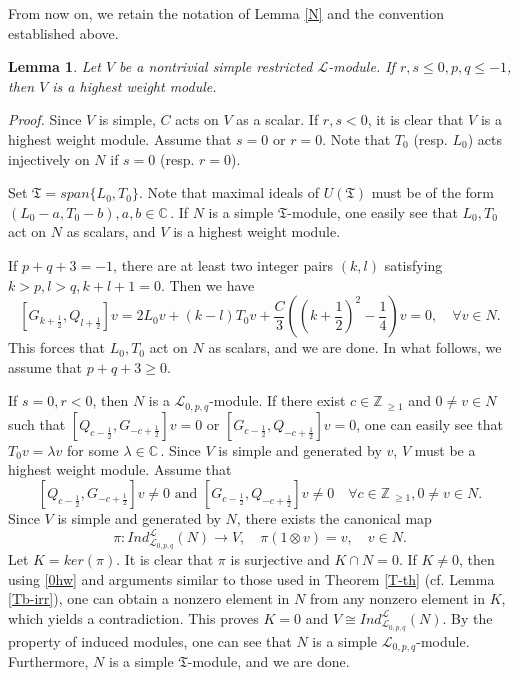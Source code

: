 \documentclass[12pt]{article}
\def\l{\lambda}
\def\ssc{\scriptscriptstyle}
\def\Z{\mathbb{Z}{\ssc\,}}
\def\C{\mathbb{C}{\ssc\,}}
\numberwithin{equation}{section}
\newtheorem{lemm}[theo]{Lemma}
\begin{document}
From now on, we retain the notation of Lemma \ref{N} and the convention established above.

\begin{lemm}\label{hw} Let $V$ be a nontrivial simple restricted $\mathcal{L}$-module. If $r,s\le 0, p,q\le -1$, then $V$ is  a highest weight module.
\end{lemm}

{\it Proof.} Since $V$ is simple, $C$ acts on $V$ as a  scalar. If $r,s<0$, it is clear that $V$ is  a highest weight module. Assume that $s=0$ or $r=0$. Note that $T_0$ (resp. $L_0$) acts injectively on $N$ if $s=0$ (resp. $r=0$).

Set $\mathfrak{T}=span\{L_0, T_0\}$.  Note that  maximal ideals of $U(\mathfrak{T})$ must be of the form $(L_0-a,T_0-b), a,b\in \C$. If $N$ is a  simple $\mathfrak{T}$-module, one easily see that $L_0,T_0$ act on $N$ as scalars, and $V$ is  a highest weight module.





If  $p+q+3=-1$,  there are at least two integer pairs $(k,l)$ satisfying $k>p,l>q, k+l+1=0$. Then we have
$$[G_{k+\frac{1}{2}},Q_{l+\frac{1}{2}}]v=2L_0v+(k-l)T_0v+\frac{C}{3}\left((k+\frac{1}{2})^2-\frac{1}{4}\right)v=0,\quad \forall v\in N.$$
This forces that $L_0,T_0$ act on $N$ as scalars, and we are done. In what follows, we assume that $p+q+3\ge 0.$

If $s=0, r<0$, then $N$ is a $\mathcal{L}_{0,p,q}$-module. If  there exist $c\in\Z_{\ge 1}$  and $0\ne v\in N$ such that $[Q_{c-\frac{1}{2}},G_{-c+\frac{1}{2}}]v=0$ or $[G_{c-\frac{1}{2}},Q_{-c+\frac{1}{2}}]v=0$, one can easily see that $T_0v=\l v$ for some $\l\in\C$. Since  $V$ is simple and generated by $v$, $V$ must be a highest weight module.  Assume that
\begin{equation}\label{0hw}[Q_{c-\frac{1}{2}},G_{-c+\frac{1}{2}}]v\ne 0 \mbox{ and } [G_{c-\frac{1}{2}},Q_{-c+\frac{1}{2}}]v\ne 0 \quad \forall c\in\Z_{\ge 1}, 0\ne v\in N.
\end{equation} Since  $V$ is simple and generated by $N$, there exists  the canonical map
 $$\pi: Ind^{\mathcal{L}}_{\mathcal{L}_{0,p,q}}(N)\rightarrow V,\quad \pi(1\otimes v)= v,\quad v\in N.$$
 Let $K=ker(\pi)$. It is clear that  $\pi$ is surjective and  $K\cap N=0$. If $K\ne 0$, then using \eqref{0hw} and arguments similar to those used in Theorem \ref{T-th} (cf. Lemma \ref{Tb-irr}), one can obtain  a nonzero element in $N$ from any nonzero element in $K$, which yields a contradiction. This proves $K=0$ and $V\cong Ind^{\mathcal{L}}_{\mathcal{L}_{0,p,q}}(N).$ By the property of induced modules, one can see that $N$ is a simple $\mathcal{L}_{0,p,q}$-module. Furthermore, $N$ is a simple $\mathfrak{T}$-module, and we are done.
\end{document}
